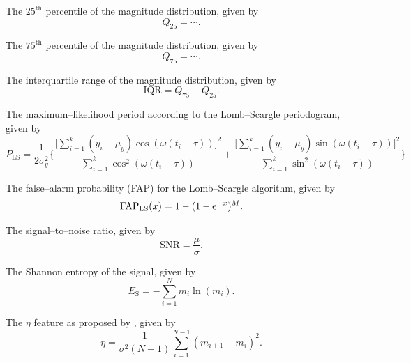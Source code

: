 \begin{enumerate}
 The $25^\text{th}$ percentile of the magnitude distribution, given by
\begin{equation}Q_{25} = \cdots.\end{equation}

 The $75^\text{th}$ percentile of the magnitude distribution, given by
\begin{equation}Q_{75} = \cdots.\end{equation}

 The interquartile range of the magnitude distribution, given by
\begin{equation}\text{IQR} = Q_{75} -Q_{25}.\end{equation}

 The maximum--likelihood period according to the Lomb--Scargle periodogram, given by
\begin{equation}P_{\text{LS}} = \frac{1}{2 \sigma_y^2} \Bigg\{ \frac{\big[\sum\limits_{i=1}^k (y_i - \mu_y) \cos(\omega(t_i - \tau))\big]^2}{\sum\limits_{i=1}^k \cos^2(\omega(t_i - \tau))} + \frac{\big[\sum\limits_{i=1}^k (y_i - \mu_y) \sin(\omega(t_i - \tau))\big]^2}{\sum\limits_{i=1}^k \sin^2(\omega(t_i - \tau))}\Bigg\}\end{equation}

 The false--alarm probability (FAP) for the Lomb--Scargle algorithm, given by
\begin{equation}\text{FAP}_{\text{LS}}(x) = 1 - (1 - \mathrm{e}^{-x})^M.\end{equation}

 The signal--to--noise ratio, given by
\begin{equation}\text{SNR} = \frac{\mu}{\sigma}.\end{equation}

 The Shannon entropy \citep{shannon1949} of the signal, given by
\begin{equation}E_\text{S} = -\sum\limits_{i=1}^N m_i \ln(m_i).\end{equation}

 The $\eta$ feature as proposed by \citet{vonneumann1941}, given by
\begin{equation}\eta = \frac{1}{\sigma^2 (N-1)} \sum\limits_{i=1}^{N-1} (m_{i+1} - m_{i})^2.\end{equation}


\end{enumerate}
